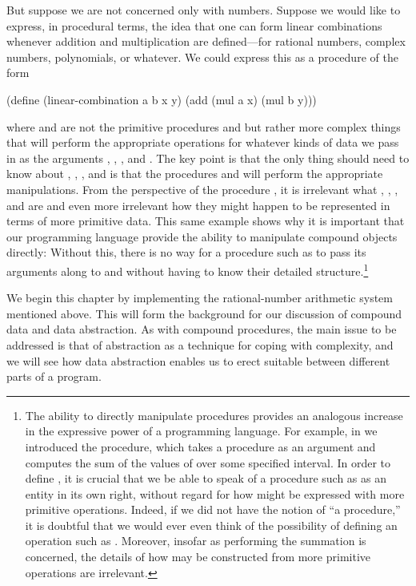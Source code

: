 \noindent
But suppose we are not concerned only with numbers.  Suppose we would like to
express, in procedural terms, the idea that one can form linear combinations
whenever addition and multiplication are defined---for rational numbers,
complex numbers, polynomials, or whatever.  We could express this as a
procedure of the form

\begin{codeBlock}
(define (linear-combination a b x y)
  (add (mul a x) (mul b y)))
\end{codeBlock}

\noindent
where  and  are not the primitive procedures \code{+} and
\code{*} but rather more complex things that will perform the appropriate
operations for whatever kinds of data we pass in as the arguments ,
, , and . The key point is that the only thing
 should need to know about , ,
, and  is that the procedures  and  will
perform the appropriate manipulations.  From the perspective of the procedure
, it is irrelevant what , , ,
and  are and even more irrelevant how they might happen to be
represented in terms of more primitive data.  This same example shows why it is
important that our programming language provide the ability to manipulate
compound objects directly: Without this, there is no way for a procedure such
as  to pass its arguments along to  and
 without having to know their detailed structure.\footnote{The
ability to directly manipulate procedures provides an analogous increase in the
expressive power of a programming language.  For example, in
 we introduced the  procedure, which takes a procedure
 as an argument and computes the sum of the values of 
over some specified interval.  In order to define , it is crucial
that we be able to speak of a procedure such as  as an entity in its
own right, without regard for how  might be expressed with more
primitive operations.  Indeed, if we did not have the notion of ``a
procedure,'' it is doubtful that we would ever even think of the possibility of
defining an operation such as .  Moreover, insofar as performing the
summation is concerned, the details of how  may be constructed from
more primitive operations are irrelevant.}

We begin this chapter by implementing the rational-number arithmetic system
mentioned above.  This will form the background for our discussion of compound
data and data abstraction.  As with compound procedures, the main issue to be
addressed is that of abstraction as a technique for coping with complexity, and
we will see how data abstraction enables us to erect suitable
 between different parts of a program.

